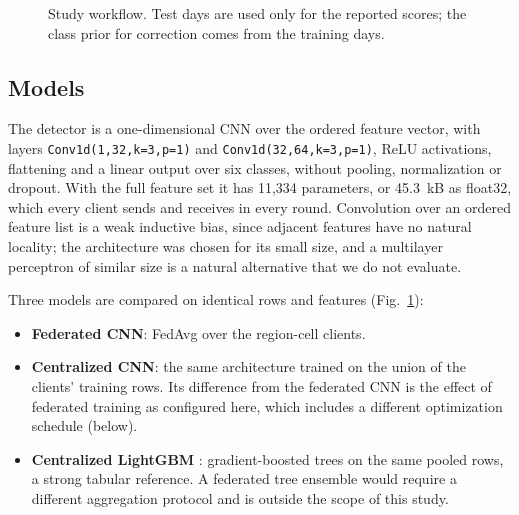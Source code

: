 \documentclass[conference]{IEEEtran}
\begin{document}
\begin{figure}[!t]\centering
{}
\caption{Study workflow. Test days are used only for the reported scores; the class prior for correction comes from the training days.}\label{fig:pipeline}\end{figure}

\subsection{Models}
The detector is a one-dimensional CNN over the ordered feature vector, with layers \texttt{Conv1d(1,32,k=3,p=1)} and \texttt{Conv1d(32,64,k=3,p=1)}, ReLU activations, flattening and a linear output over six classes, without pooling, normalization or dropout. With the full feature set it has 11,334 parameters, or 45.3~kB as float32, which every client sends and receives in every round. Convolution over an ordered feature list is a weak inductive bias, since adjacent features have no natural locality; the architecture was chosen for its small size, and a multilayer perceptron of similar size is a natural alternative that we do not evaluate.

Three models are compared on identical rows and features (Fig.~\ref{fig:pipeline}):
\begin{itemize}
\item \textbf{Federated CNN}: FedAvg over the region-cell clients.
\item \textbf{Centralized CNN}: the same architecture trained on the union of the clients' training rows. Its difference from the federated CNN is the effect of federated training as configured here, which includes a different optimization schedule (below).
\item \textbf{Centralized LightGBM} \cite{ke2017}: gradient-boosted trees on the same pooled rows, a strong tabular reference. A federated tree ensemble would require a different aggregation protocol and is outside the scope of this study.
\end{itemize}
\end{document}
